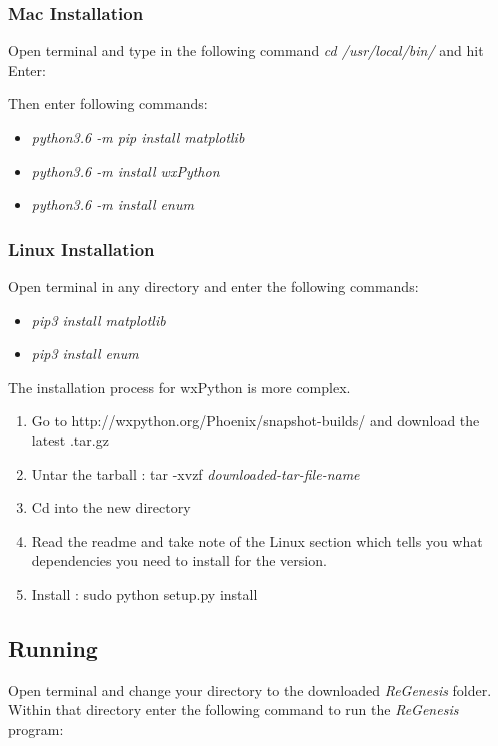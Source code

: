 \documentclass[11pt]{article}
\begin{document}
\subsubsection{Mac Installation}

Open terminal and type in the following command \textit{cd /usr/local/bin/} and hit Enter: 

\noindent Then enter following commands:

\begin{itemize}
\item \textit{python3.6 -m pip install matplotlib}
\item \textit{python3.6 -m install wxPython}
\item \textit{python3.6 -m install enum}
\end{itemize}


\subsubsection{Linux Installation}
Open terminal in any directory and enter the following commands:

\begin{itemize}
\item \textit{pip3 install matplotlib}
\item \textit{pip3 install enum}
\end{itemize}
The installation process for wxPython is more complex.
\begin{enumerate}
\item Go to http://wxpython.org/Phoenix/snapshot-builds/ and download the latest .tar.gz
\item Untar the tarball : tar -xvzf \textit{downloaded-tar-file-name}
\item Cd into the new directory
\item Read the readme and take note of the Linux section which tells you what dependencies you need to install for the version.
\item Install : sudo python setup.py install
\end{enumerate}

\subsection{Running}

Open terminal and change your directory to the downloaded \textit{ReGenesis} folder. Within that directory enter the following command to run the \textit{ReGenesis} program: 
\newline
\end{document}
